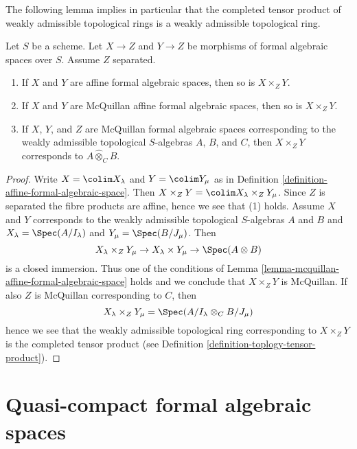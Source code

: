 \noindent
The following lemma implies in particular that the completed
tensor product of weakly admissible topological rings is
a weakly admissible topological ring.

\begin{lemma}
\label{lemma-fibre-product-affines-over-separated}
Let $S$ be a scheme. Let $X \to Z$ and $Y \to Z$ be morphisms
of formal algebraic spaces over $S$. Assume $Z$ separated.
\begin{enumerate}
\item If $X$ and $Y$ are affine formal algebraic spaces, then
so is $X \times_Z Y$.
\item If $X$ and $Y$ are McQuillan affine formal algebraic spaces, then
so is $X \times_Z Y$.
\item If $X$, $Y$, and $Z$ are McQuillan formal algebraic spaces
corresponding to the weakly admissible topological $S$-algebras
$A$, $B$, and $C$, then $X \times_Z Y$ corresponds to
$A \widehat{\otimes}_C B$.
\end{enumerate}
\end{lemma}

\begin{proof}
Write $X = \colim X_\lambda$ and $Y = \colim Y_\mu$ as
in Definition \ref{definition-affine-formal-algebraic-space}.
Then $X \times_Z Y = \colim X_\lambda \times_Z Y_\mu$.
Since $Z$ is separated the fibre products are affine, hence
we see that (1) holds. Assume $X$ and $Y$ corresponds to
the weakly admissible topological $S$-algebras $A$ and $B$
and $X_\lambda = \Spec(A/I_\lambda)$ and $Y_\mu = \Spec(B/J_\mu)$.
Then
$$
X_\lambda \times_Z Y_\mu \to
X_\lambda \times Y_\mu \to \Spec(A \otimes B)
$$
is a closed immersion. Thus one of the conditions of
Lemma \ref{lemma-mcquillan-affine-formal-algebraic-space}
holds and we conclude that $X \times_Z Y$ is McQuillan.
If also $Z$ is McQuillan corresponding to $C$, then
$$
X_\lambda \times_Z Y_\mu = \Spec(A/I_\lambda \otimes_C B/J_\mu)
$$
hence we see that the weakly admissible topological ring
corresponding to $X \times_Z Y$ is the completed tensor product
(see Definition \ref{definition-toplogy-tensor-product}).
\end{proof}





\section{Quasi-compact formal algebraic spaces}
\label{section-quasi-compact}

